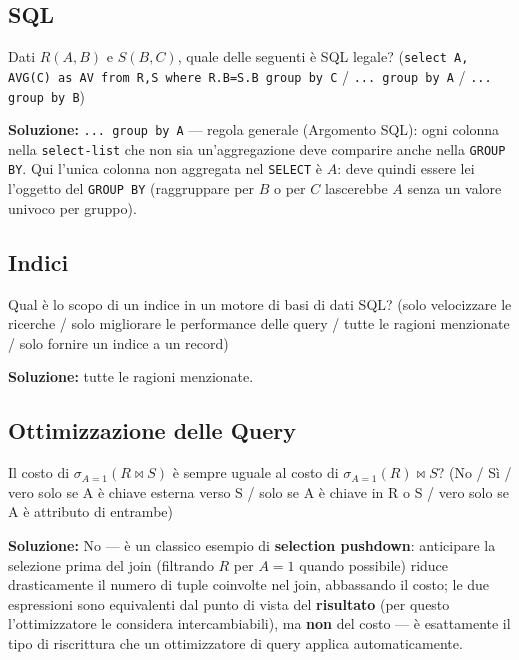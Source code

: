 \documentclass[12pt, a4paper]{article}
\begin{document}
\subsection{SQL}

\begin{tcolorbox}[colback=lightergray!10, colframe=tocsec, title=\textbf{Esercizio 9}]
Dati $R(A,B)$ e $S(B,C)$, quale delle seguenti è SQL legale? (\texttt{select A, AVG(C) as AV from R,S where R.B=S.B group by C} / \texttt{... group by A} / \texttt{... group by B})
\end{tcolorbox}
\textbf{Soluzione:} \texttt{... group by A} — regola generale (Argomento SQL): ogni colonna nella \texttt{select-list} che non sia un'aggregazione deve comparire anche nella \texttt{GROUP BY}. Qui l'unica colonna non aggregata nel \texttt{SELECT} è $A$: deve quindi essere lei l'oggetto del \texttt{GROUP BY} (raggruppare per $B$ o per $C$ lascerebbe $A$ senza un valore univoco per gruppo).

\subsection{Indici}

\begin{tcolorbox}[colback=lightergray!10, colframe=tocsec, title=\textbf{Esercizio 10}]
Qual è lo scopo di un indice in un motore di basi di dati SQL? (solo velocizzare le ricerche / solo migliorare le performance delle query / tutte le ragioni menzionate / solo fornire un indice a un record)
\end{tcolorbox}
\textbf{Soluzione:} tutte le ragioni menzionate.

\subsection{Ottimizzazione delle Query}

\begin{tcolorbox}[colback=lightergray!10, colframe=tocsec, title=\textbf{Esercizio 11}]
Il costo di $\sigma_{A=1}(R\bowtie S)$ è sempre uguale al costo di $\sigma_{A=1}(R)\bowtie S$? (No / Sì / vero solo se A è chiave esterna verso S / solo se A è chiave in R o S / vero solo se A è attributo di entrambe)
\end{tcolorbox}
\textbf{Soluzione:} No — è un classico esempio di \textbf{selection pushdown}: anticipare la selezione prima del join (filtrando $R$ per $A=1$ quando possibile) riduce drasticamente il numero di tuple coinvolte nel join, abbassando il costo; le due espressioni sono equivalenti dal punto di vista del \textbf{risultato} (per questo l'ottimizzatore le considera intercambiabili), ma \textbf{non} del costo — è esattamente il tipo di riscrittura che un ottimizzatore di query applica automaticamente.
\end{document}
